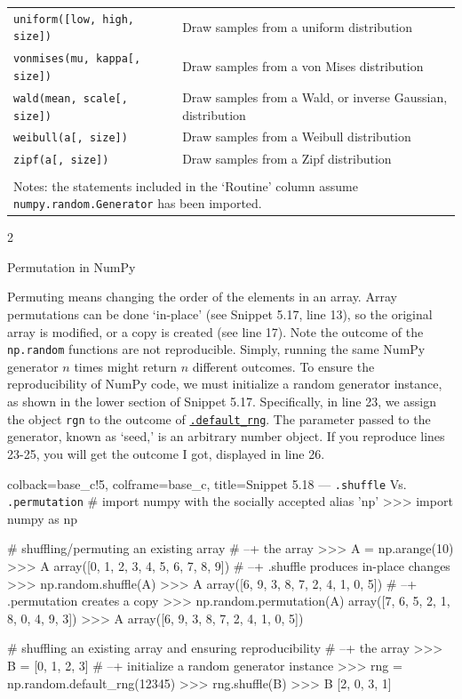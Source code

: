\documentclass[a4paper,11pt]{book}
\newcommand{\question}[1]{%
    \begin{tcolorbox}[colback=comp_c!10,colframe=comp_c,sidebyside align=top,width=\linewidth,before skip=1ex]
        #1
    \end{tcolorbox}
    \switchcolumn%
}
\newcommand{\note}[1]{%
    \begin{tcolorbox}[colback=white!0,colframe=white!10,width=\linewidth,before skip=1ex]
        #1
    \end{tcolorbox}
}
\begin{document}
\begin{table}
\begin{tabular}{lp{12cm}}
\texttt{uniform([low, high, size])} &
                        Draw samples from a uniform distribution\\
\texttt{vonmises(mu, kappa[, size])} &
                        Draw samples from a von Mises distribution\\
\texttt{wald(mean, scale[, size])} &
                        Draw samples from a Wald, or inverse Gaussian, distribution\\
\texttt{weibull(a[, size])} &
                        Draw samples from a Weibull distribution\\
\texttt{zipf(a[, size])} &
                        Draw samples from a Zipf distribution\\
	     	\bottomrule \\[-1.8ex]
	        \multicolumn{2}{l}{Notes: the statements included in the `Routine' column assume \texttt{numpy.random.Generator} has been imported.} \\
	\end{tabular}
\end{table}
\clearpage

\begin{paracol}{2}
	\question{\raggedright Permutation in NumPy}
	\note{Permuting means changing the order of the elements in an array. Array permutations can be done `in-place' (see Snippet 5.17, line 13), so the original array is modified, or a copy is created (see line 17). Note the outcome of the \texttt{np.random} functions are not reproducible. Simply, running the same NumPy generator $n$ times might return $n$ different outcomes. To ensure the reproducibility of NumPy code, we must initialize a random generator instance, as shown in the lower section of Snippet 5.17. Specifically, in line 23, we assign the object \texttt{rgn} to the outcome of \href{https://numpy.org/doc/stable/reference/random/generator.html\#numpy.random.Generator}{\texttt{.default\_rng}}. The parameter passed to the generator, known as `seed,' is an arbitrary number object. If you reproduce lines 23-25, you will get the outcome I got, displayed in line 26.}
\end{paracol}

\begin{pythoncode}[linenos=true,]{colback=base_c!5, colframe=base_c, title=\sffamily Snippet 5.18 --- \texttt{.shuffle} Vs. \texttt{.permutation}}
# import numpy with the socially accepted alias 'np'
>>> import numpy as np

# shuffling/permuting an existing array
# --+ the array
>>> A = np.arange(10)
>>> A
array([0, 1, 2, 3, 4, 5, 6, 7, 8, 9])
# --+ .shuffle produces in-place changes
>>> np.random.shuffle(A)
>>> A
array([6, 9, 3, 8, 7, 2, 4, 1, 0, 5])
# --+ .permutation creates a copy
>>> np.random.permutation(A)
array([7, 6, 5, 2, 1, 8, 0, 4, 9, 3])
>>> A
array([6, 9, 3, 8, 7, 2, 4, 1, 0, 5])

# shuffling an existing array and ensuring reproducibility
# --+ the array
>>> B = [0, 1, 2, 3]
# --+ initialize a random generator instance
>>> rng = np.random.default_rng(12345)
>>> rng.shuffle(B)
>>> B
[2, 0, 3, 1]
\end{pythoncode}
\clearpage
\end{document}
